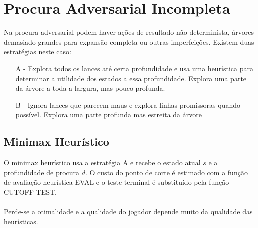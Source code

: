 \documentclass[10pt,a4paper]{report}
\begin{document}
\section{Procura Adversarial Incompleta}
Na procura adversarial podem haver ações de resultado não determinista, árvores demasiado grandes para expansão completa ou outras imperfeições. Existem duas estratégias neste caso:
\begin{itemize}
\item[A] - Explora todos os lances até certa profundidade e usa uma heurística para determinar a utilidade dos estados a essa profundidade. Explora uma parte da árvore a toda a largura, mas pouco profunda.
\item[B] - Ignora lances que parecem maus e explora linhas promissoras quando possível. Explora uma parte profunda mas estreita da árvore
\end{itemize}
\subsection{Minimax Heurístico}
O minimax heurístico usa a estratégia A e recebe o estado atual $s$ e a profundidade de procura $d$. O custo do ponto de corte é estimado com a função de avaliação heurística EVAL e o teste terminal é substituído pela função CUTOFF-TEST.\\
\\
Perde-se a otimalidade e a qualidade do jogador depende muito da qualidade das heurísticas.
\end{document}
